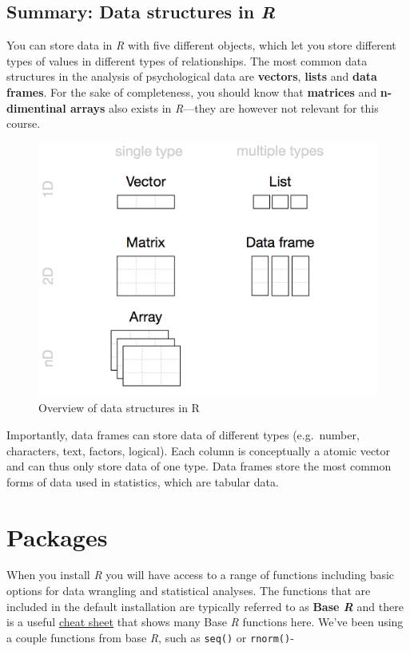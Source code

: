 \documentclass[
]{scrartcl}
\begin{document}
\subsection{\texorpdfstring{Summary: Data structures in \emph{R}}{Summary: Data structures in R}}\label{summary-data-structures-in-r}

You can store data in \emph{R} with five different objects, which let you store different types of values in different types of relationships. The most common data structures in the analysis of psychological data are \textbf{vectors}, \textbf{lists} and \textbf{data frames}. For the sake of completeness, you should know that \textbf{matrices} and \textbf{n-dimentinal arrays} also exists in \emph{R}---they are however not relevant for this course.

\begin{figure}
\includegraphics[width=650px]{images/r_data_types} \caption{Overview of data structures in R}\label{fig:unnamed-chunk-127}
\end{figure}

Importantly, data frames can store data of different types (e.g.~number, characters, text, factors, logical). Each column is conceptually a atomic vector and can thus only store data of one type. Data frames store the most common forms of data used in statistics, which are tabular data.

\section{Packages}\label{packages}

When you install \emph{R} you will have access to a range of functions including basic options for data wrangling and statistical analyses. The functions that are included in the default installation are typically referred to as \textbf{Base \emph{R}} and there is a useful \hyperref[cheatsheets]{cheat sheet} that shows many Base \emph{R} functions here. We've been using a couple functions from base \emph{R}, such as \texttt{seq()} or \texttt{rnorm()}-
\end{document}
